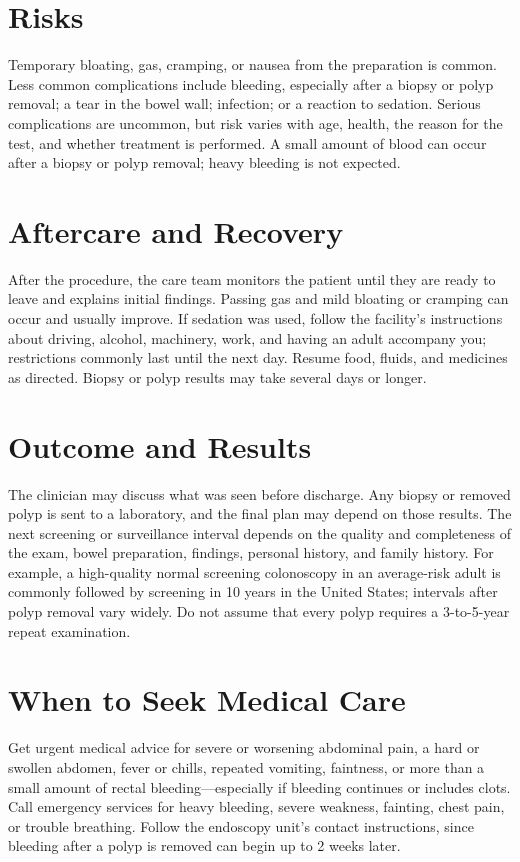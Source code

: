 \section*{Risks}
Temporary bloating, gas, cramping, or nausea from the preparation is common. Less common complications include bleeding, especially after a biopsy or polyp removal; a tear in the bowel wall; infection; or a reaction to sedation. Serious complications are uncommon, but risk varies with age, health, the reason for the test, and whether treatment is performed. A small amount of blood can occur after a biopsy or polyp removal; heavy bleeding is not expected.

\section*{Aftercare and Recovery}
After the procedure, the care team monitors the patient until they are ready to leave and explains initial findings. Passing gas and mild bloating or cramping can occur and usually improve. If sedation was used, follow the facility's instructions about driving, alcohol, machinery, work, and having an adult accompany you; restrictions commonly last until the next day. Resume food, fluids, and medicines as directed. Biopsy or polyp results may take several days or longer.

\section*{Outcome and Results}
The clinician may discuss what was seen before discharge. Any biopsy or removed polyp is sent to a laboratory, and the final plan may depend on those results. The next screening or surveillance interval depends on the quality and completeness of the exam, bowel preparation, findings, personal history, and family history. For example, a high-quality normal screening colonoscopy in an average-risk adult is commonly followed by screening in 10 years in the United States; intervals after polyp removal vary widely. Do not assume that every polyp requires a 3-to-5-year repeat examination.

\section*{When to Seek Medical Care}
Get urgent medical advice for severe or worsening abdominal pain, a hard or swollen abdomen, fever or chills, repeated vomiting, faintness, or more than a small amount of rectal bleeding—especially if bleeding continues or includes clots. Call emergency services for heavy bleeding, severe weakness, fainting, chest pain, or trouble breathing. Follow the endoscopy unit's contact instructions, since bleeding after a polyp is removed can begin up to 2 weeks later.

